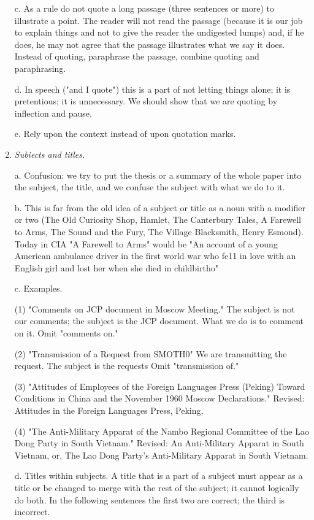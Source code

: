 \documentclass[
    oneside,
    11pt,
    draft
]{memoir}
\begin{document}
\begin{enumerate}
  c. As a rule do not quote a long passage (three sentences or more) to illustrate a point. The reader will not read the passage (because it is our job to explain things and not to give the reader the undigested lumps) and, if he does, he may not agree that the passage illustrates what we say it does. Instead of quoting, paraphrase the passage, combine quoting and paraphrasing.
  
  d. In speech ("and I quote") this is a part of not letting things alone; it is pretentious; it is unnecessary. We should show that we are quoting by inflection and pause. 
  
  e. Rely upon the context instead of upon quotation marks.
  
  \item \emph{Subiects and titles.}
  
  a. Confusion: we try to put the thesis or a summary of the whole paper into the subject, the title, and we confuse the subject with what we do to it.
  
  b. This is far from the old idea of a subject or title as a noun with a modifier or two (The Old Curiosity Shop, Hamlet, The Canterbury Tales, A Farewell to Arms, The Sound and the Fury, The Village Blacksmith, Henry Esmond). Today in CIA "A Farewell to Arms" would be "An account of a young American ambulance driver in the first world war who fe11 in love with an English girl and lost her when she died in childbirtho" 
  
  c. Examples.
  
  (1) "Comments on JCP document in Moscow Meeting." The subject is not our comments; the subject is the JCP document. What we do is to comment on it. Omit "comments on." 
  
  (2) "Transmission of a Request from SMOTH0" We are transmitting the request. The subject is the requests Omit "transmission of." 
  
  (3)  "Attitudes of Employees of the Foreign Languages Press (Peking) Toward Conditions in China and the November 1960 Moscow Declarations." Revised: Attitudes in the Foreign Languages Press, Peking, 
  
  (4) "The Anti-Military Apparat of the Nambo Regional Committee of the Lao Dong Party in South Vietnam." Revised: An Anti-Military Apparat in South Vietnam, or, The Lao Dong Party's Anti-Military Apparat in South Vietnam.
  
  d. Titles within subjects. A title that is a part of a subject must appear as a title or be changed to merge with the rest of the subject; it cannot logically do both. In the following sentences the first two are correct; the third is incorrect. 
  

\end{enumerate}
\end{document}
